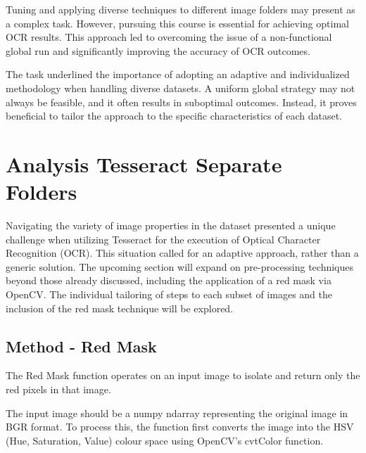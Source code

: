 Tuning and applying diverse techniques to different image folders may present as a complex task. However, pursuing this course is essential for achieving optimal OCR results. This approach led to overcoming the issue of a non-functional global run and significantly improving the accuracy of OCR outcomes.

The task underlined the importance of adopting an adaptive and individualized methodology when handling diverse datasets. A uniform global strategy may not always be feasible, and it often results in suboptimal outcomes. Instead, it proves beneficial to tailor the approach to the specific characteristics of each dataset.

\newpage

\section{Analysis Tesseract Separate Folders}

Navigating the variety of image properties in the dataset presented a unique challenge when utilizing Tesseract for the execution of Optical Character Recognition (OCR). This situation called for an adaptive approach, rather than a generic solution. The upcoming section will expand on pre-processing techniques beyond those already discussed, including the application of a red mask via OpenCV. The individual tailoring of steps to each subset of images and the inclusion of the red mask technique will be explored.

\subsection*{Method - Red Mask}

The Red Mask function operates on an input image to isolate and return only the red pixels in that image.

The input image should be a numpy ndarray representing the original image in BGR format. To process this, the function first converts the image into the HSV (Hue, Saturation, Value) colour space using OpenCV's cvtColor function.

